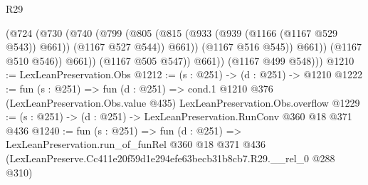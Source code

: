 \begin{lexlean}{R29}
\begin{coremodule}
                    (@724
                      (@730
                        (@740
                          (@799
                            (@805
                              (@815 (@933 (@939 (@1166 (@1167 @529 @543)) @661)) (@1167 @527 @544))
                              @661))
                          (@1167 @516 @545))
                        @661))
                    (@1167 @510 @546))
                  @661))
              (@1167 @505 @547))
            @661))
        (@1167 @499 @548)))
@1210 := LexLeanPreservation.Obs
@1212 := (s : @251) -> (d : @251) -> @1210
@1222 := fun (s : @251) =>
  fun (d : @251) =>
  cond.{1} @1210 @376 (LexLeanPreservation.Obs.value @435) LexLeanPreservation.Obs.overflow
@1229 := (s : @251) -> (d : @251) -> LexLeanPreservation.RunConv @360 @18 @371 @436
@1240 := fun (s : @251) =>
  fun (d : @251) =>
  LexLeanPreservation.run_of_funRel
    @360
    @18
    @371
    @436
    (LexLeanPreserve.Cc411e20f59d1e294efe63becb31b8cb7.R29.__rel_0 @288 @310)
\end{coremodule}
\end{lexlean}
